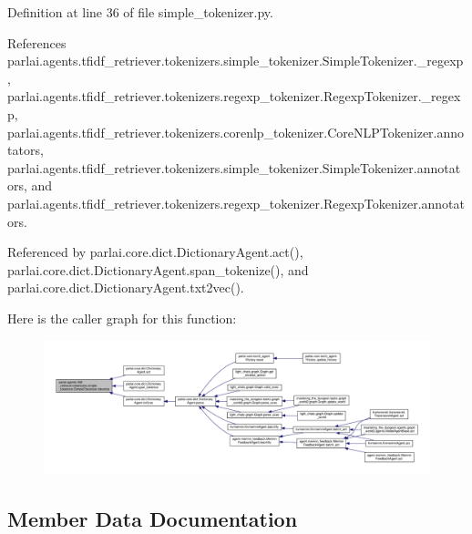 Definition at line 36 of file simple\+\_\+tokenizer.\+py.



References parlai.\+agents.\+tfidf\+\_\+retriever.\+tokenizers.\+simple\+\_\+tokenizer.\+Simple\+Tokenizer.\+\_\+regexp, parlai.\+agents.\+tfidf\+\_\+retriever.\+tokenizers.\+regexp\+\_\+tokenizer.\+Regexp\+Tokenizer.\+\_\+regexp, parlai.\+agents.\+tfidf\+\_\+retriever.\+tokenizers.\+corenlp\+\_\+tokenizer.\+Core\+N\+L\+P\+Tokenizer.\+annotators, parlai.\+agents.\+tfidf\+\_\+retriever.\+tokenizers.\+simple\+\_\+tokenizer.\+Simple\+Tokenizer.\+annotators, and parlai.\+agents.\+tfidf\+\_\+retriever.\+tokenizers.\+regexp\+\_\+tokenizer.\+Regexp\+Tokenizer.\+annotators.



Referenced by parlai.\+core.\+dict.\+Dictionary\+Agent.\+act(), parlai.\+core.\+dict.\+Dictionary\+Agent.\+span\+\_\+tokenize(), and parlai.\+core.\+dict.\+Dictionary\+Agent.\+txt2vec().

Here is the caller graph for this function\+:
\nopagebreak
\begin{figure}[H]
\begin{center}
\leavevmode
\includegraphics[width=350pt]{classparlai_1_1agents_1_1tfidf__retriever_1_1tokenizers_1_1simple__tokenizer_1_1SimpleTokenizer_a690bc237be6349de5c3f105e0be37ea7_icgraph}
\end{center}
\end{figure}


\subsection{Member Data Documentation}
\mbox{\label{classparlai_1_1agents_1_1tfidf__retriever_1_1tokenizers_1_1simple__tokenizer_1_1SimpleTokenizer_a05623c8143b625ce794a3575065a485f}} 
